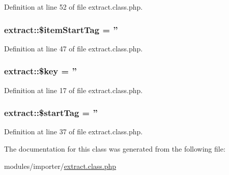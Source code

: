 Definition at line 52 of file extract.\+class.\+php.

\hypertarget{classextract_a11629128aedd1fc4b0a889640c693d0a}{
\subsubsection[{\$item\+Start\+Tag}]{\setlength{\rightskip}{0pt plus 5cm}extract\+::\$item\+Start\+Tag = ''}}\label{classextract_a11629128aedd1fc4b0a889640c693d0a}


Definition at line 47 of file extract.\+class.\+php.

\hypertarget{classextract_a894aac7e47b9ed0773922aa7eb9ce578}{
\subsubsection[{\$key}]{\setlength{\rightskip}{0pt plus 5cm}extract\+::\$key = ''}}\label{classextract_a894aac7e47b9ed0773922aa7eb9ce578}


Definition at line 17 of file extract.\+class.\+php.

\hypertarget{classextract_a3acbe3af3d1b083b33023202a5e05432}{
\subsubsection[{\$start\+Tag}]{\setlength{\rightskip}{0pt plus 5cm}extract\+::\$start\+Tag = ''}}\label{classextract_a3acbe3af3d1b083b33023202a5e05432}


Definition at line 37 of file extract.\+class.\+php.



The documentation for this class was generated from the following file\+:\begin{DoxyCompactItemize}
\item 
modules/importer/\hyperlink{extract_8class_8php}{extract.\+class.\+php}\end{DoxyCompactItemize}
